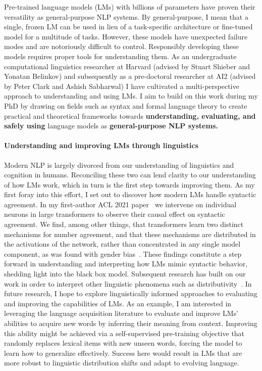 \documentclass[11pt]{article}
\begin{document}
Pre-trained language models (LMs) with billions of parameters 
have proven their versatility 
as general-purpose NLP systems. 
By general-purpose, I mean that a single, frozen LM can be used 
in lieu of a task-specific architecture or fine-tuned model 
for a multitude of tasks.
However, these models have unexpected failure modes 
and are notoriously difficult to control.
Responsibly developing these models
requires proper tools for understanding them.
As an undergraduate computational linguistics researcher at Harvard 
(advised by Stuart Shieber and Yonatan Belinkov)
and subsequently as a pre-doctoral researcher at AI2 
(advised by Peter Clark and Ashish Sabharwal)
I have cultivated a multi-perspective approach to understanding and using LMs.
I aim to build on this work during my PhD
by drawing on fields such as syntax and formal language theory 
to create practical and theoretical frameworks  
towards \textbf{understanding, evaluating, and safely using} language models 
as \textbf{general-purpose NLP systems.}

\paragraph{Understanding and improving LMs through linguistics}

Modern NLP is largely divorced 
from our understanding of linguistics and cognition in humans.
Reconciling these two can lend clarity to our understanding of how LMs work, 
which in turn is the first step towards improving them.
As my first foray into this effort, I set out to 
discover how modern LMs handle syntactic agreement.
In my first-author ACL 2021 paper~\cite{finlayson-etal-2021-causal}
we intervene on individual neurons in large transformers 
to observe their causal effect on syntactic agreement.
We find, among other things, that transformers learn 
two distinct mechanisms for number agreement,
and that these mechanisms are distributed 
in the activations of the network, 
rather than concentrated in any single model component,
as was found with gender bias~\cite{Vig2020InvestigatingGB}.
These findings constitute a step forward 
in understanding and interpreting
how LMs mimic syntactic behavior,
shedding light into the black box model.
Subsequent research has built on our work 
in order to interpret other linguistic phenomena 
such as distributivity~\cite{Ban2022TestingPL}.
In future research, I hope to explore 
linguistically informed approaches
to evaluating and improving the capabilities of LMs. 
As an example, I am interested in leveraging 
the language acquisition literature
to evaluate and improve LMs' abilities 
to acquire new words by inferring their meaning from context.
Improving this ability might be achieved 
via a self-supervised pre-training objective 
that randomly replaces lexical items with new unseen words, 
forcing the model to learn how to generalize effectively.
Success here would result in LMs that are 
more robust to linguistic distribution shifts
and adapt to evolving language.
\end{document}
